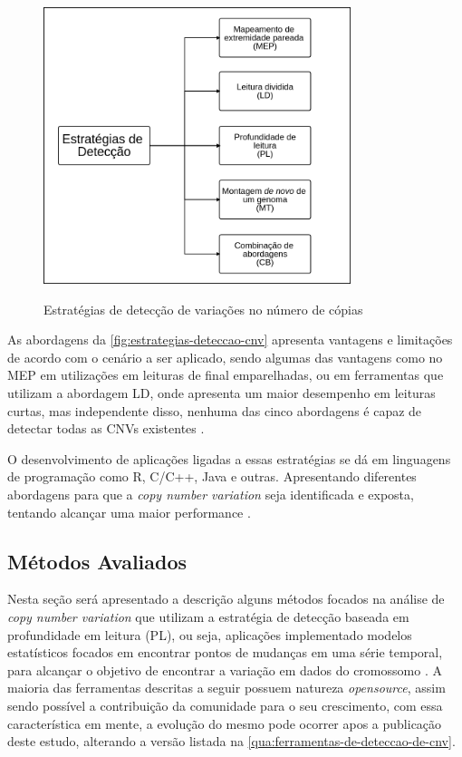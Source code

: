 \begin{figure}[!htb]
    \centering
    \caption{Estratégias de detecção de variações no número de cópias}
    \includegraphics[width=0.8\textwidth]{./dados/figuras/estrategias-deteccao-cnv}
    \label{fig:estrategias-deteccao-cnv}
\end{figure}

As abordagens da \autoref{fig:estrategias-deteccao-cnv} apresenta vantagens e limitações de acordo com o cenário a ser aplicado, sendo algumas das vantagens como no MEP em utilizações em leituras de final emparelhadas, ou em ferramentas que utilizam a abordagem LD, onde apresenta um maior desempenho em leituras curtas, mas independente disso, nenhuma das cinco abordagens é capaz de detectar todas as CNVs existentes \cite{Zhao2013}. 

O desenvolvimento de aplicações ligadas a essas estratégias se dá em linguagens de programação como R, C/C++, Java e outras. Apresentando diferentes abordagens para que a \textit{copy number variation} seja identificada e exposta, tentando alcançar uma maior performance \cite{Zhao2013}. 

\subsection{Métodos Avaliados} 

Nesta seção será apresentado a descrição alguns métodos focados na análise de \textit{copy number variation} que utilizam a estratégia de detecção baseada em profundidade em leitura (PL), ou seja, aplicações implementado modelos estatísticos focados em encontrar pontos de mudanças em uma série temporal, para alcançar o objetivo de encontrar a variação em dados do cromossomo \cite{Zhao2013}. A maioria das ferramentas descritas a seguir possuem natureza \textit{opensource}, assim sendo possível a contribuição da comunidade para o seu crescimento, com essa característica em mente, a evolução do mesmo pode ocorrer apos a publicação deste estudo, alterando a versão listada na \autoref{qua:ferramentas-de-deteccao-de-cnv}.


